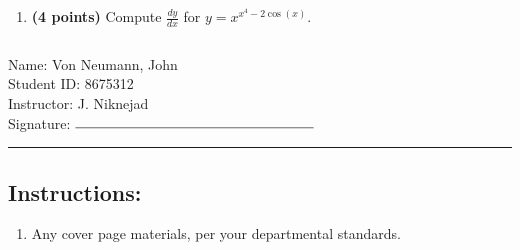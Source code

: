 \documentclass[12pt]{amsart}
\begin{document}
\begin{enumerate}
\vfill 
\def \varexp{4}\def \newexp{3}\def \trigcoeff{-2}\def \trigval{-2}\def \oppval{+2}
\item {\bf (4 points)} 
 Compute $\frac{dy}{dx}$ for $y=x^{x^\varexp \trigval \cos(x)}$.

\vfill 
\newpage  $ $   \newpage\end{enumerate}\graphicspath{{C:/Users/iainc/anaconda3/Randomizer/MATH 1001/Midterm 1/}}\setcounter{page}{1}


\thispagestyle{fancy}

 \noindent Name: Von Neumann, John \vspace{.3cm} \\\noindent Student ID: 8675312 \vspace{.3cm} \\\noindent Instructor: J. Niknejad \vspace{.3cm} \\\noindent Signature: $\rule{6cm}{0.15mm}$ \vspace{.3cm} \\ 



\vspace{.4cm}


\vspace{.4cm}

\hrule

\subsection*{Instructions:} \begin{enumerate}[1.]
\item Any cover page materials, per your departmental standards.
\end{enumerate}
\end{document}
